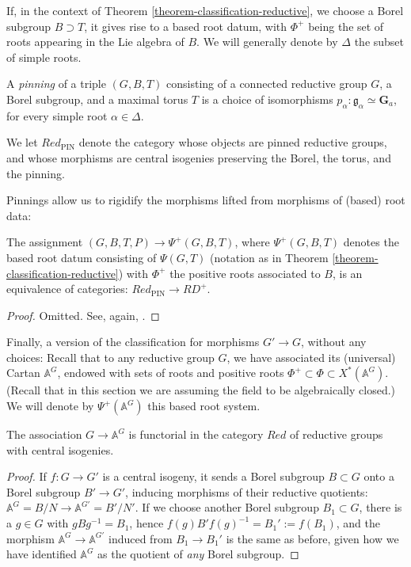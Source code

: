 If, in the context of Theorem \ref{theorem-classification-reductive}, we choose a Borel subgroup $B\supset T$, it gives rise to a based root datum, with $\Phi^+$ being the set of roots appearing in the Lie algebra of $B$. We will generally denote by $\Delta$ the subset of simple roots.

\begin{definition}
 \label{definition-pinning}
A {\it pinning} of a triple $(G, B, T)$ consisting of a connected reductive group $G$, a Borel subgroup,  and a maximal torus $T$ is a choice of isomorphisms $p_\alpha:\mathfrak g_\alpha \simeq \mathbf G_a$, for every simple root $\alpha\in \Delta$.

We let $Red_{\text{PIN}}$ denote the category whose objects are pinned reductive groups, and whose morphisms are central isogenies preserving the Borel, the torus, and the pinning.
\end{definition}

Pinnings allow us to rigidify the morphisms lifted from morphisms of (based) root data:

\begin{theorem}
\label{theorem-classification-with-pinning}
The assignment $(G, B, T, P) \to \Psi^+(G,B,T)$, where $\Psi^+(G,B,T)$ denotes the based root datum consisting of $\Psi(G,T)$ (notation as in Theorem \ref{theorem-classification-reductive}) with $\Phi^+$ the positive roots associated to $B$, is an equivalence of categories: $Red_{\text{PIN}}\to RD^+$.
\end{theorem}

\begin{proof}
 Omitted. See, again, \cite{Springer-Corvallis}. 
\end{proof}

Finally, a version of the classification for morphisms $G'\to G$, without any choices: Recall that to any reductive group $G$, we have associated its (universal) Cartan $\mathbb A^G$, endowed with sets of roots and positive roots $\Phi^+\subset \Phi\subset X^*(\mathbb A^G)$. (Recall that in this section we are assuming the field to be algebraically closed.) We will denote by $\Psi^+(\mathbb A^G)$ this based root system.

\begin{lemma}
 \label{lemma-Cartan-functorial}
The association $G\to \mathbb A^G$ is functorial in the category $Red$ of reductive groups with central isogenies.
\end{lemma}

\begin{proof}
 If $f:G\to G'$ is a central isogeny, it sends a Borel subgroup $B\subset G$ onto a Borel subgroup $B'\to G'$, inducing morphisms of their reductive quotients: $\mathbb A^G=B/N\to \mathbb A^{G'}=B'/N'$. If we choose another Borel subgroup $B_1\subset G$, there is a $g\in G$ with $g B g^{-1} = B_1$, hence $f(g) B' f(g)^{-1} = B_1':=f(B_1)$, and the morphism $\mathbb A^G\to \mathbb A^{G'}$ induced from $B_1\to B_1'$ is the same as before, given how we have identified $\mathbb A^G$ as the quotient of \emph{any} Borel subgroup.
\end{proof}



